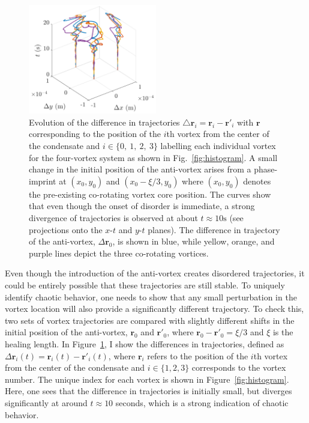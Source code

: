 \begin{figure}
\center \includegraphics[width=0.5\textwidth]{data/2d/evolution/evolution}

\caption{
Evolution of the difference in trajectories $\triangle \textbf{r}_i = \textbf{r}_{i}-\textbf{r}'_{i}$ with $\textbf{r}$ corresponding to the position of the $i$th vortex from the center of the condensate and $i\in \{0,\ 1,\ 2,\ 3\}$ labelling each individual vortex for the four-vortex system as shown in Fig.~\ref{fig:histogram}.
A small change in the initial position of the anti-vortex arises from a phase-imprint at $(x_{0},y_{0})$ and $(x_{0}-\xi/3,y_{0})$ where $(x_{0},y_{0})$ denotes the pre-existing co-rotating vortex core position.
The curves show that even though the onset of disorder is immediate, a strong divergence of trajectories is observed at about $t\approx 10 \text{s}$ (see projections onto the $x$-$t$ and $y$-$t$ planes).
The difference in trajectory of the anti-vortex, $\Delta \mathbf{r}_0$, is shown in blue, while yellow, orange, and purple lines depict the three co-rotating vortices.
}
\label{fig:evolution}
\end{figure}

Even though the introduction of the anti-vortex creates disordered trajectories, it could be entirely possible that these trajectories are still stable.
To uniquely identify chaotic behavior, one needs to show that any small perturbation in the vortex location will also provide a significantly different trajectory.
To check this, two sets of vortex trajectories are compared with slightly different shifts in the initial position of the anti-vortex, $\mathbf{r}_0$ and $\mathbf{r}'_0$, where $\mathbf{r}_0 - \mathbf{r}'_0 = \xi/3$ and $\xi$ is the healing length.
In Figure~\ref{fig:evolution}, I show the differences in trajectories, defined as $\Delta \mathbf{r}_i(t) = \mathbf{r}_{i}(t)-\mathbf{r}'_{i}(t)$, where $\mathbf{r}_i$ refers to the position of the $i$th vortex from the center of the condensate and $i\in \{1,2,3\}$ corresponds to the vortex number.
The unique index for each vortex is shown in Figure~\ref{fig:histogram}.
Here, one sees that the difference in trajectories is initially small, but diverges significantly at around $t \approx 10$ seconds, which is a strong indication of chaotic behavior.

